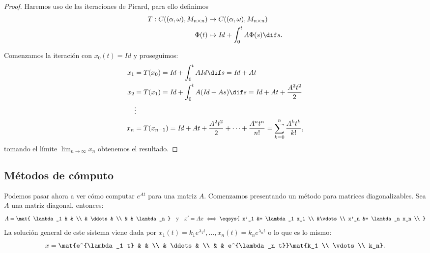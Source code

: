 \documentclass[../main.tex]{subfiles}
\begin{document}
\begin{proof}
	Haremos uso de las iteraciones de Picard, para ello definimos
	\begin{align*}
		T : C((\alpha, \omega), M_{n \times n}) &\to 
			C((\alpha, \omega), M_{n \times n}) \\
		\Phi(t) &\mapsto \mathit{Id} + \int_0^t A \Phi(s) \dif s.
	\end{align*}

	Comenzamos la iteración con \(x_0(t) = \mathit{Id}\) y proseguimos:
	\begin{align*}
		x_1 &= T(x_0) = \mathit{Id} + \int_0^t A \mathit{Id} \dif s = 
			\mathit{Id} + At \\
		x_2 &= T(x_1) = \mathit{Id} + \int_0^t A (\mathit{Id} + As) \dif s = 
			\mathit{Id} + At + \frac{A^2 t^2}{2} \\
		&\vdots \\
		x_n &= T(x_{n - 1}) =
			\mathit{Id} + At + \frac{A^2 t^2}{2} + \cdots + \frac{A^n t^n}{n!}
			= \sum_{k = 0}^n \frac{A^k t^k}{k!},
	\end{align*}
	tomando el límite \(\lim_{n \to \infty} x_n\) obtenemos el resultado.
\end{proof}

\subsection{Métodos de cómputo}

Podemos pasar ahora a ver cómo computar \(e^{At}\) para una matriz \(A\).
Comenzamos presentando un método para matrices diagonalizables. Sea \(A\) una
matriz diagonal, entonces:
\[A = \mat{
	\lambda_1 & & \\
	& \ddots & \\
	& & \lambda_n
	}
	\quad \text{y} \quad
	x' = Ax \iff
	\eqsys{
		x'_1 &= \lambda_1 x_1 \\
		&\vdots \\
		x'_n &= \lambda_n x_n \\
		}
	\]
La solución general de este sistema viene dada por 
\(x_1(t) = k_1 e^{\lambda_1 t}, \dots, x_n(t) = k_n e^{\lambda_n t}\) o lo que es
lo mismo:
\[x = \mat{e^{\lambda_1 t} & & \\ & \ddots & \\ & & e^{\lambda_n t}} 
	\mat{k_1 \\ \vdots \\ k_n}.\]
\end{document}
